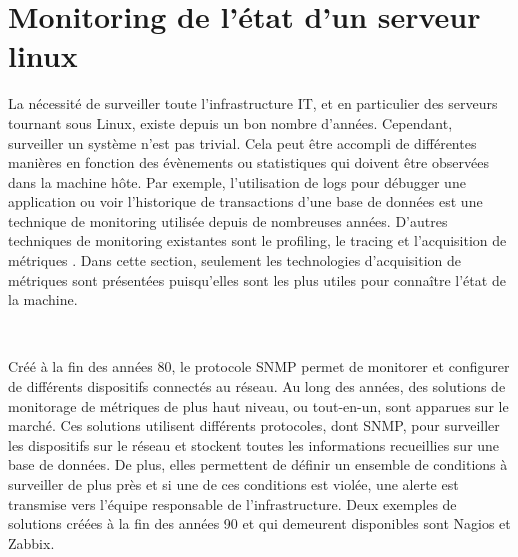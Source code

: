 \section{Monitoring de l'état d'un serveur linux}

La nécessité de surveiller toute l’infrastructure IT, et en particulier des serveurs tournant sous Linux, existe depuis un bon nombre d’années. Cependant, surveiller un système n’est pas trivial. Cela peut être accompli de différentes manières en fonction des évènements ou statistiques qui doivent être observées dans la machine hôte. Par exemple, l’utilisation de logs pour débugger une application ou voir l’historique de transactions d’une base de données est une technique de monitoring utilisée depuis de nombreuses années. D’autres techniques de monitoring existantes sont le profiling, le tracing et l’acquisition de métriques \cite{brazil2018prometheus}. Dans cette section, seulement les technologies d’acquisition de métriques sont présentées puisqu’elles sont les plus utiles pour connaître l’état de la machine.

~

\noindent
Créé à la fin des années 80, le protocole SNMP \cite{RFC1098, RFC1157} permet de monitorer et configurer de différents dispositifs connectés au réseau. Au long des années, des solutions de monitorage de métriques de plus haut niveau, ou tout-en-un, sont apparues sur le marché. Ces solutions utilisent différents protocoles, dont SNMP, pour surveiller les dispositifs sur le réseau et stockent toutes les informations recueillies sur une base de données. De plus, elles permettent de définir un ensemble de conditions à surveiller de plus près et si une de ces conditions est violée, une alerte est transmise vers l’équipe responsable de l’infrastructure. Deux exemples de solutions créées à la fin des années 90 et qui demeurent disponibles sont Nagios et Zabbix.

~

